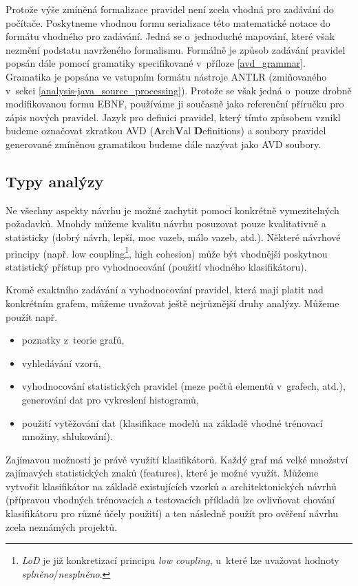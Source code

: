 Protože výše zmíněná formalizace pravidel není zcela vhodná pro zadávání do počítače. Poskytneme vhodnou formu serializace této matematické notace do formátu vhodného pro zadávání. Jedná se o~jednoduché mapování, které však nezmění podstatu navrženého formalismu. Formálně je způsob zadávání pravidel popsán dále pomocí gramatiky specifikované v~příloze \ref{avd_grammar}. Gramatika je popsána ve vstupním formátu nástroje ANTLR (zmiňovaného v~sekci \ref{analysis-java_source_processing}). Protože se však jedná o~pouze drobně modifikovanou formu EBNF, používáme ji současně jako referenční příručku pro zápis nových pravidel. Jazyk pro definici pravidel, který tímto způsobem vznikl budeme označovat zkratkou AVD (\textbf{A}rch\textbf{V}al \textbf{D}efinitions) a soubory pravidel generované zmíněnou gramatikou budeme dále nazývat jako AVD soubory.

\subsection{Typy analýzy}

Ne všechny aspekty návrhu je možné zachytit pomocí konkrétně vymezitelných požadavků.  Mnohdy můžeme kvalitu návrhu posuzovat pouze kvalitativně a statisticky (dobrý návrh, lepší, moc vazeb, málo vazeb, atd.). Některé návrhové principy (např. low coupling\footnote{\emph{LoD} je již konkretizací principu \emph{low coupling}, u~které lze uvažovat hodnoty \emph{splněno}/\emph{nesplněno}.}, high cohesion) může být vhodnější poskytnou statistický přístup pro vyhodnocování (použití vhodného klasifikátoru).

Kromě exaktního zadávání a vyhodnocování pravidel, která mají platit nad konkrétním grafem, můžeme uvažovat ještě nejrůznější druhy analýzy. Můžeme použít např.

\begin{itemize}
\item poznatky z~teorie grafů,
\item vyhledávání vzorů,
\item vyhodnocování statistických pravidel (meze počtů elementů v~grafech, atd.), generování dat pro vykreslení histogramů,
\item použití vytěžování dat (klasifikace modelů na základě vhodné trénovací množiny, shlukování).
\end{itemize}

Zajímavou možností je právě využití klasifikátorů. Každý graf má velké množství zajímavých statistických znaků (features), které je možné využít. Můžeme vytvořit klasifikátor na základě existujících vzorků  a  architektonických návrhů (přípravou vhodných trénovacích a testovacích příkladů lze ovlivňovat chování klasifikátoru pro různé účely použití) a ten následně použít pro ověření návrhu zcela neznámých projektů.

